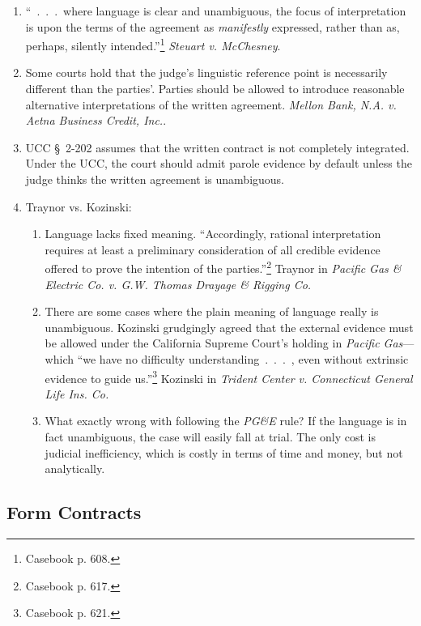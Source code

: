 \begin{enumerate}
    \item ``~.~.~.~where language is clear and unambiguous, the focus of 
    interpretation is upon the terms of the agreement as \emph{manifestly} 
    expressed, rather than as, perhaps, silently intended.''\footnote{Casebook 
    p. 608.} \emph{Steuart v. McChesney}.
    \item Some courts hold that the judge's linguistic reference point is 
    necessarily different than the parties'. Parties should be allowed to 
    introduce reasonable alternative interpretations of the written agreement. 
    \emph{Mellon Bank, N.A. v. Aetna Business Credit, Inc.}.
    \item UCC \S\ 2-202 assumes that the written contract is not completely 
    integrated. Under the UCC, the court should admit parole evidence by 
    default unless the judge thinks the written agreement is unambiguous.
    \item Traynor vs. Kozinski:
    \begin{enumerate}
        \item Language lacks fixed meaning. ``Accordingly, rational 
        interpretation requires at least a preliminary consideration of all 
        credible evidence offered to prove the intention of the 
        parties.''\footnote{Casebook p. 617.} Traynor in \emph{Pacific Gas \& 
        Electric Co. v. G.W. Thomas Drayage \& Rigging Co.}
        \item There are some cases where the plain meaning of language really 
        is unambiguous. Kozinski grudgingly agreed that the external evidence 
        must be allowed under the California Supreme Court's holding in 
        \emph{Pacific Gas}---which ``we have no difficulty 
        understanding~.~.~.~, even without extrinsic evidence to guide 
        us.''\footnote{Casebook p. 621.} Kozinski in \emph{Trident Center v. 
        Connecticut General Life Ins. Co.}
        \item What exactly wrong with following the \emph{PG\&E} 
        rule? If the language is in fact unambiguous, the case will easily 
        fall at trial. The only cost is judicial inefficiency, which is costly 
        in terms of time and money, but not analytically.
    \end{enumerate}
\end{enumerate} 

\subsection{Form Contracts}

